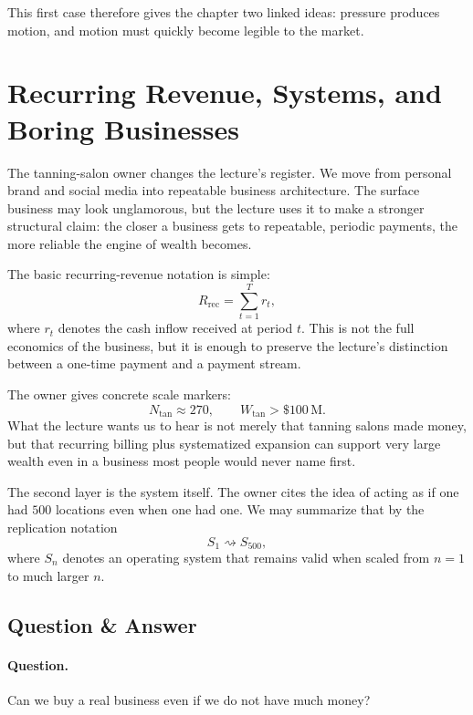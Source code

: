 This first case therefore gives the chapter two linked ideas: pressure produces motion, and motion must quickly become legible to the market.

\section{Recurring Revenue, Systems, and Boring Businesses}

The tanning-salon owner changes the lecture's register. We move from personal brand and social media into repeatable business architecture. The surface business may look unglamorous, but the lecture uses it to make a stronger structural claim: the closer a business gets to repeatable, periodic payments, the more reliable the engine of wealth becomes.

The basic recurring-revenue notation is simple:
\begin{equation}
R_{\mathrm{rec}} = \sum_{t=1}^{T} r_t,
\end{equation}
where \(r_t\) denotes the cash inflow received at period \(t\). This is not the full economics of the business, but it is enough to preserve the lecture's distinction between a one-time payment and a payment stream.

The owner gives concrete scale markers:
\begin{equation}
N_{\mathrm{tan}} \approx 270,
\qquad
W_{\mathrm{tan}} > \$100\,\mathrm{M}.
\end{equation}
What the lecture wants us to hear is not merely that tanning salons made money, but that recurring billing plus systematized expansion can support very large wealth even in a business most people would never name first.

The second layer is the system itself. The owner cites the idea of acting as if one had \(500\) locations even when one had one. We may summarize that by the replication notation
\begin{equation}
S_1 \rightsquigarrow S_{500},
\end{equation}
where \(S_n\) denotes an operating system that remains valid when scaled from \(n=1\) to much larger \(n\).

\subsection{Question \& Answer}

\paragraph{Question.} Can we buy a real business even if we do not have much money?


